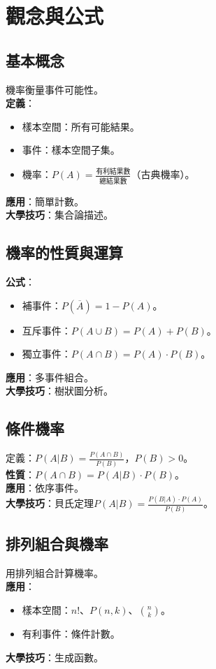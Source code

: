 \section{觀念與公式}

\subsection{基本概念}
機率衡量事件可能性。\\
\textbf{定義}：
\begin{itemize}
    \item 樣本空間：所有可能結果。
    \item 事件：樣本空間子集。
    \item 機率：$P(A) = \frac{\text{有利結果數}}{\text{總結果數}}$（古典機率）。
\end{itemize}
\textbf{應用}：簡單計數。\\
\textbf{大學技巧}：集合論描述。

\subsection{機率的性質與運算}
\textbf{公式}：
\begin{itemize}
    \item 補事件：$P(\overline{A}) = 1 - P(A)$。
    \item 互斥事件：$P(A \cup B) = P(A) + P(B)$。
    \item 獨立事件：$P(A \cap B) = P(A) \cdot P(B)$。
\end{itemize}
\textbf{應用}：多事件組合。\\
\textbf{大學技巧}：樹狀圖分析。

\subsection{條件機率}
定義：$P(A|B) = \frac{P(A \cap B)}{P(B)}$，$P(B) > 0$。\\
\textbf{性質}：$P(A \cap B) = P(A|B) \cdot P(B)$。\\
\textbf{應用}：依序事件。\\
\textbf{大學技巧}：貝氏定理$P(A|B) = \frac{P(B|A) \cdot P(A)}{P(B)}$。

\subsection{排列組合與機率}
用排列組合計算機率。\\
\textbf{應用}：
\begin{itemize}
    \item 樣本空間：$n!$、$P(n,k)$、$\binom{n}{k}$。
    \item 有利事件：條件計數。
\end{itemize}
\textbf{大學技巧}：生成函數。

